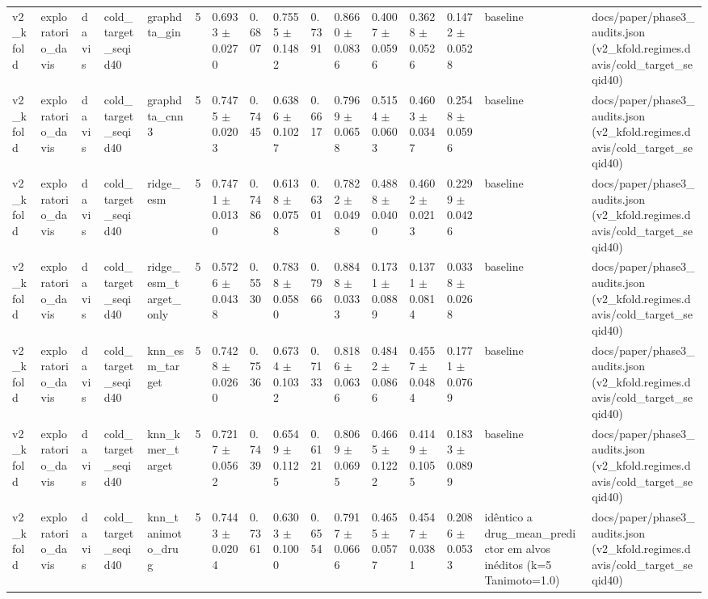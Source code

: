 \begin{table}[htbp]
\begin{tabular}{llllllllllllllll}
v2\_kfold & exploratorio\_davis & davis & cold\_target\_seqid40 & graphdta\_gin & 5 & 0.6933 $\pm$ 0.0270 & 0.6807 & 0.7555 $\pm$ 0.1482 & 0.7391 & 0.8660 $\pm$ 0.0836 & 0.4007 $\pm$ 0.0596 & 0.3628 $\pm$ 0.0526 & 0.1472 $\pm$ 0.0528 & baseline & docs/paper/phase3\_audits.json (v2\_kfold.regimes.davis/cold\_target\_seqid40) \\
v2\_kfold & exploratorio\_davis & davis & cold\_target\_seqid40 & graphdta\_cnn3 & 5 & 0.7475 $\pm$ 0.0203 & 0.7445 & 0.6386 $\pm$ 0.1027 & 0.6617 & 0.7969 $\pm$ 0.0658 & 0.5154 $\pm$ 0.0603 & 0.4603 $\pm$ 0.0347 & 0.2548 $\pm$ 0.0596 & baseline & docs/paper/phase3\_audits.json (v2\_kfold.regimes.davis/cold\_target\_seqid40) \\
v2\_kfold & exploratorio\_davis & davis & cold\_target\_seqid40 & ridge\_esm & 5 & 0.7471 $\pm$ 0.0130 & 0.7486 & 0.6138 $\pm$ 0.0758 & 0.6301 & 0.7822 $\pm$ 0.0498 & 0.4888 $\pm$ 0.0400 & 0.4602 $\pm$ 0.0213 & 0.2299 $\pm$ 0.0426 & baseline & docs/paper/phase3\_audits.json (v2\_kfold.regimes.davis/cold\_target\_seqid40) \\
v2\_kfold & exploratorio\_davis & davis & cold\_target\_seqid40 & ridge\_esm\_target\_only & 5 & 0.5726 $\pm$ 0.0438 & 0.5530 & 0.7838 $\pm$ 0.0580 & 0.7966 & 0.8848 $\pm$ 0.0333 & 0.1731 $\pm$ 0.0889 & 0.1371 $\pm$ 0.0814 & 0.0338 $\pm$ 0.0268 & baseline & docs/paper/phase3\_audits.json (v2\_kfold.regimes.davis/cold\_target\_seqid40) \\
v2\_kfold & exploratorio\_davis & davis & cold\_target\_seqid40 & knn\_esm\_target & 5 & 0.7428 $\pm$ 0.0260 & 0.7536 & 0.6734 $\pm$ 0.1032 & 0.7133 & 0.8186 $\pm$ 0.0636 & 0.4842 $\pm$ 0.0866 & 0.4557 $\pm$ 0.0484 & 0.1771 $\pm$ 0.0769 & baseline & docs/paper/phase3\_audits.json (v2\_kfold.regimes.davis/cold\_target\_seqid40) \\
v2\_kfold & exploratorio\_davis & davis & cold\_target\_seqid40 & knn\_kmer\_target & 5 & 0.7217 $\pm$ 0.0562 & 0.7439 & 0.6549 $\pm$ 0.1125 & 0.6121 & 0.8069 $\pm$ 0.0695 & 0.4665 $\pm$ 0.1222 & 0.4149 $\pm$ 0.1055 & 0.1833 $\pm$ 0.0899 & baseline & docs/paper/phase3\_audits.json (v2\_kfold.regimes.davis/cold\_target\_seqid40) \\
v2\_kfold & exploratorio\_davis & davis & cold\_target\_seqid40 & knn\_tanimoto\_drug & 5 & 0.7443 $\pm$ 0.0204 & 0.7361 & 0.6303 $\pm$ 0.1000 & 0.6554 & 0.7917 $\pm$ 0.0666 & 0.4655 $\pm$ 0.0577 & 0.4547 $\pm$ 0.0381 & 0.2086 $\pm$ 0.0533 & idêntico a drug\_mean\_predictor em alvos inéditos (k=5 Tanimoto=1.0) & docs/paper/phase3\_audits.json (v2\_kfold.regimes.davis/cold\_target\_seqid40) \\

\end{tabular}
\end{table}
